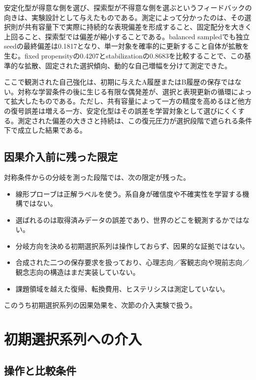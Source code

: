 \documentclass[11pt,a4paper]{ltjsarticle}
\begin{document}
安定化型が得意な側を選び、探索型が不得意な側を選ぶというフィードバックの向きは、実験設計として与えたものである。測定によって分かったのは、その選択則が共有容量下で実際に持続的な表現偏差を形成すること、固定配分を大きく上回ること、探索型では偏差が縮小することである。balanced sampledでも独立seedの最終偏差は0.1817となり、単一対象を確率的に更新すること自体が拡散を生む。fixed propensityの0.4207とstabilizationの0.8683を比較することで、この基準的な拡散、固定された選択傾向、動的な自己増幅を分けて測定できた。

ここで観測された自己強化は、初期に与えたA履歴またはB履歴の保存ではない。対称な学習条件の後に生じる有限な偶発差が、選択と表現更新の循環によって拡大したものである。ただし、共有容量によって一方の精度を高めるほど他方の復号誤差は増える一方、安定化型はその誤差を学習対象として選びにくくする。測定された偏差の大きさと持続は、この復元圧力が選択段階で遮られる条件下で成立した結果である。

\subsection{因果介入前に残った限定}

対称条件からの分岐を測った段階では、次の限定が残った。

\begin{itemize}
\item 線形プローブは正解ラベルを使う。系自身が確信度や不確実性を学習する機構ではない。
\item 選ばれるのは取得済みデータの誤差であり、世界のどこを観測するかではない。
\item 分岐方向を決める初期選択系列は操作しておらず、因果的な証拠ではない。
\item 合成された二つの保存要求を扱っており、心理志向／客観志向や現前志向／観念志向の構造はまだ実装していない。
\item 課題領域を越えた復帰、転換費用、ヒステリシスは測定していない。
\end{itemize}

このうち初期選択系列の因果効果を、次節の介入実験で扱う。

\section{初期選択系列への介入}

\subsection{操作と比較条件}
\end{document}
